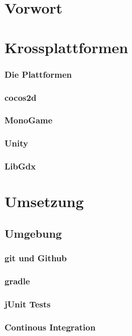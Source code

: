 \section{Vorwort}
\section{Krossplattformen}
	\subsubsection{Die Plattformen}
	\subsubsection{cocos2d}
	\subsubsection{MonoGame}
	\subsubsection{Unity}
	\subsubsection{LibGdx}
\section{Umsetzung}
	\subsection{Umgebung}
		\subsubsection{git und Github}
		\subsubsection{gradle}
		\subsubsection{jUnit Tests}
		\subsubsection{Continous Integration}
